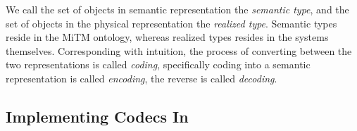 We call the set of objects in semantic representation the \textit{semantic type}, and the set of objects in the physical representation the \textit{realized type}. 
Semantic types reside in the MiTM ontology, whereas realized types resides in the systems themselves. 
Corresponding with intuition, the process of converting between the two representations is called \textit{coding}, specifically coding into a semantic representation is called \textit{encoding}, the reverse is called \textit{decoding}. 

\subsection{Implementing Codecs In \mmt}\label{sec:vt:mmt}

\begin{figure}[h!]
  \begin{center}
  \end{center}


\end{figure}
